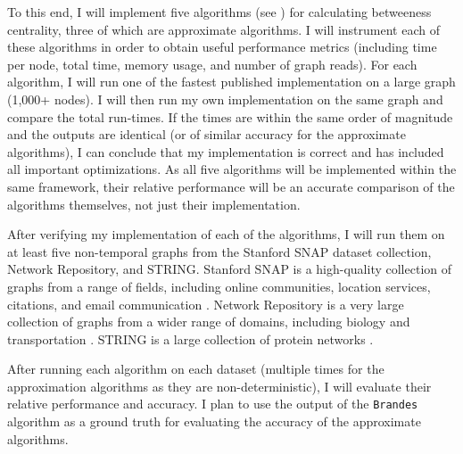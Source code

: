 \documentclass[a4paper,12pt]{article}
\begin{document}
To this end, I will implement five algorithms (see  ) for calculating betweeness centrality, three of which are approximate algorithms. I will instrument each of these algorithms in order to obtain useful performance metrics (including time per node, total time, memory usage, and number of graph reads). For each algorithm, I will run one of the fastest published implementation on a large graph (1,000+ nodes). I will then run my own implementation on the same graph and compare the total run-times. If the times are within the same order of magnitude and the outputs are identical (or of similar accuracy for the approximate algorithms), I can conclude that my implementation is correct and has included all important optimizations. As all five algorithms will be implemented within the same framework, their relative performance will be an accurate comparison of the algorithms themselves, not just their implementation.

After verifying my implementation of each of the algorithms, I will run them on at least five non-temporal graphs from the Stanford SNAP dataset collection, Network Repository, and STRING. Stanford SNAP is a high-quality collection of graphs from a range of fields, including online communities, location services, citations, and email communication \cite{snap}. Network Repository is a very large collection of graphs from a wider range of domains, including biology and transportation \cite{repository}. STRING is a large collection of protein networks \cite{string}.

After running each algorithm on each dataset (multiple times for the approximation algorithms as they are non-deterministic), I will evaluate their relative performance and accuracy. I plan to use the output of the \verb|Brandes| algorithm as a ground truth for evaluating the accuracy of the approximate algorithms.
\end{document}
